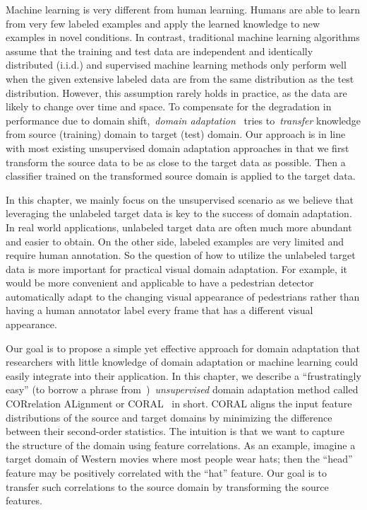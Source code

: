 \documentclass[graybox]{svmult}
\begin{document}
Machine learning is very different from human learning. Humans are able to learn from very few labeled examples and apply the learned knowledge to new examples in novel conditions. In contrast, traditional machine learning algorithms assume that the training and test data are independent and identically distributed (i.i.d.) and supervised machine learning methods only perform well when the given extensive labeled data are from the same distribution as the test distribution. However, this assumption rarely holds in practice, as the data are likely to change over time and space. To compensate for the degradation in performance due to domain shift,~\emph{domain adaptation}~\cite{saenko2010adapting,sa,gfk,long_cvpr,bmvc15,coral,tzeng_arxiv15,daume} tries to~\emph{transfer} knowledge from source (training) domain to target (test) domain. Our approach is in line with most existing unsupervised domain adaptation approaches in that we first transform the source data to be as close to the target data as possible. Then a classifier trained on the transformed source domain is applied to the target data.

In this chapter, we mainly focus on the unsupervised scenario as we believe that leveraging the unlabeled target data is key to the success of domain adaptation. In real world applications, unlabeled target data are often much more abundant and easier to obtain. On the other side, labeled examples are very limited and require human annotation. So the question of how to utilize the unlabeled target data is more important for practical visual domain adaptation. For example, it would be more convenient and applicable to have a pedestrian detector automatically adapt to the changing visual appearance of pedestrians rather than having a human annotator label every frame that has a different visual appearance.

Our goal is to propose a simple yet effective approach for domain adaptation that researchers with little knowledge of domain adaptation or machine learning could easily integrate into their application. In this chapter, we describe a ``frustratingly easy'' (to borrow a phrase from~\cite{daume})~\emph{unsupervised} domain adaptation method called CORrelation ALignment or CORAL~\cite{coral} in short. CORAL aligns the input feature distributions of the source and target domains by minimizing the difference between their second-order statistics. The intuition is that we want to capture the structure of the domain using feature correlations. As an example, imagine a target domain of Western movies where most people wear hats; then the ``head'' feature may be positively correlated with the ``hat'' feature. Our goal is to transfer such correlations to the source domain by transforming the source features.
\end{document}
